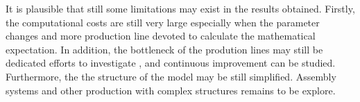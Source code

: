 It is plausible that still some limitations may exist in the results obtained.
Firstly, the computational costs are still very large especially when the parameter changes and more production line devoted to calculate the mathematical expectation. In addition, the bottleneck of the prodution lines may still be dedicated efforts to investigate , and continuous improvement can be studied. Furthermore, the the structure of the model may be still simplified. Assembly systems and other production with complex structures remains to be explore. 
